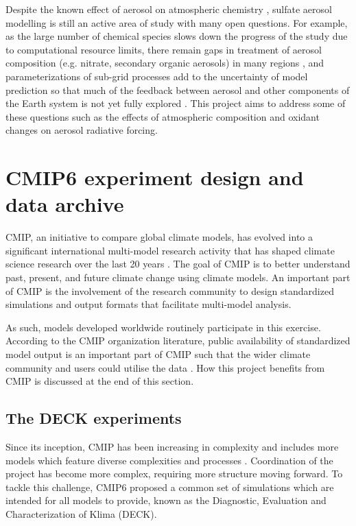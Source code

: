 Despite the known effect of aerosol on atmospheric chemistry \citep[e.g.][]{oconnorApportionmentPreIndustrial2022}, sulfate aerosol modelling is still an active area of study with many open questions. For example, as the large number of chemical species slows down the progress of the study due to computational resource limits, there remain gaps in treatment of aerosol composition (e.g. nitrate, secondary organic aerosols) in many regions \citep[e.g.][]{mulcahyDescriptionEvaluationAerosol2020}, and parameterizations of sub-grid processes add to the uncertainty of model prediction so that much of the feedback between aerosol and other components of the Earth system is not yet fully explored \citep{seikiImprovementGlobalCloudSystemResolving2015}. This project aims to address some of these questions such as the effects of atmospheric composition and oxidant changes on aerosol radiative forcing.



\section{CMIP6 experiment design and data archive}
\label{sec:1.CMIP6}

CMIP, an initiative to compare global climate models, has evolved into a significant international multi-model research activity that has shaped climate science research over the last 20 years \citep{eyringOverviewCoupledModel2016}. The goal of CMIP is to better understand past, present, and future climate change using climate models. An important part of CMIP is the involvement of the research community to design standardized simulations and output formats that facilitate multi-model analysis. 

As such, models developed worldwide routinely participate in this exercise. According to the CMIP organization literature, public availability of standardized model output is an important part of CMIP such that the wider climate community and users could utilise the data \citep{eyringOverviewCoupledModel2016}. How this project benefits from CMIP is discussed at the end of this section.

\subsection{The DECK experiments}

Since its inception, CMIP has been increasing in complexity and includes more models which feature diverse complexities and processes \citep{eyringOverviewCoupledModel2016}. Coordination of the project has become more complex, requiring more structure moving forward. To tackle this challenge, CMIP6 proposed a common set of simulations which are intended for all models to provide, known as the Diagnostic, Evaluation and Characterization of Klima (DECK). 

